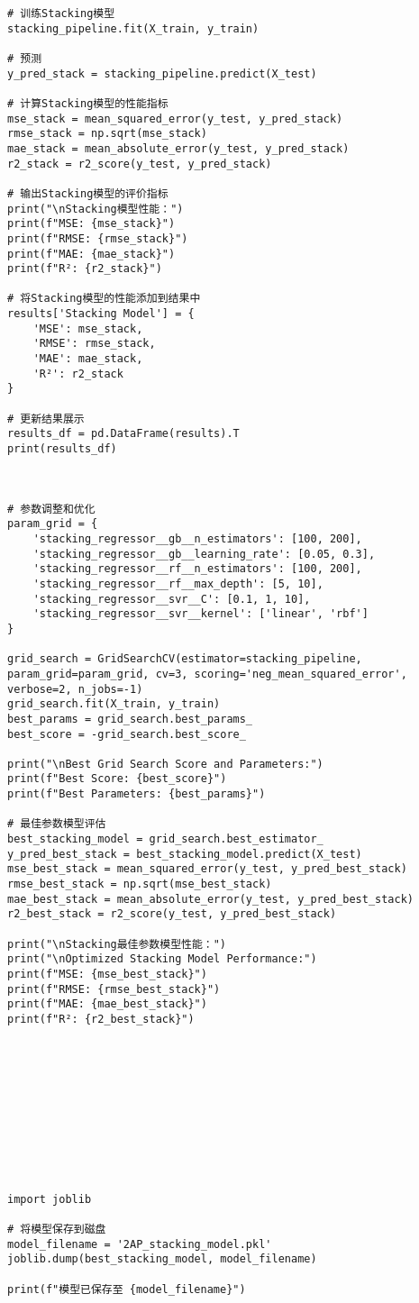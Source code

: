 \documentclass[bwprint]{gmcmthesis}
\begin{document}
\begin{lstlisting}
# 训练Stacking模型
stacking_pipeline.fit(X_train, y_train)

# 预测
y_pred_stack = stacking_pipeline.predict(X_test)

# 计算Stacking模型的性能指标
mse_stack = mean_squared_error(y_test, y_pred_stack)
rmse_stack = np.sqrt(mse_stack)
mae_stack = mean_absolute_error(y_test, y_pred_stack)
r2_stack = r2_score(y_test, y_pred_stack)

# 输出Stacking模型的评价指标
print("\nStacking模型性能：")
print(f"MSE: {mse_stack}")
print(f"RMSE: {rmse_stack}")
print(f"MAE: {mae_stack}")
print(f"R²: {r2_stack}")

# 将Stacking模型的性能添加到结果中
results['Stacking Model'] = {
	'MSE': mse_stack,
	'RMSE': rmse_stack,
	'MAE': mae_stack,
	'R²': r2_stack
}

# 更新结果展示
results_df = pd.DataFrame(results).T
print(results_df)



# 参数调整和优化
param_grid = {
	'stacking_regressor__gb__n_estimators': [100, 200],
	'stacking_regressor__gb__learning_rate': [0.05, 0.3],
	'stacking_regressor__rf__n_estimators': [100, 200],
	'stacking_regressor__rf__max_depth': [5, 10],
	'stacking_regressor__svr__C': [0.1, 1, 10],
	'stacking_regressor__svr__kernel': ['linear', 'rbf']
}

grid_search = GridSearchCV(estimator=stacking_pipeline, param_grid=param_grid, cv=3, scoring='neg_mean_squared_error', verbose=2, n_jobs=-1)
grid_search.fit(X_train, y_train)
best_params = grid_search.best_params_
best_score = -grid_search.best_score_

print("\nBest Grid Search Score and Parameters:")
print(f"Best Score: {best_score}")
print(f"Best Parameters: {best_params}")

# 最佳参数模型评估
best_stacking_model = grid_search.best_estimator_
y_pred_best_stack = best_stacking_model.predict(X_test)
mse_best_stack = mean_squared_error(y_test, y_pred_best_stack)
rmse_best_stack = np.sqrt(mse_best_stack)
mae_best_stack = mean_absolute_error(y_test, y_pred_best_stack)
r2_best_stack = r2_score(y_test, y_pred_best_stack)

print("\nStacking最佳参数模型性能：")
print("\nOptimized Stacking Model Performance:")
print(f"MSE: {mse_best_stack}")
print(f"RMSE: {rmse_best_stack}")
print(f"MAE: {mae_best_stack}")
print(f"R²: {r2_best_stack}")











import joblib

# 将模型保存到磁盘
model_filename = '2AP_stacking_model.pkl'
joblib.dump(best_stacking_model, model_filename)

print(f"模型已保存至 {model_filename}")

\end{lstlisting}
\end{document}
